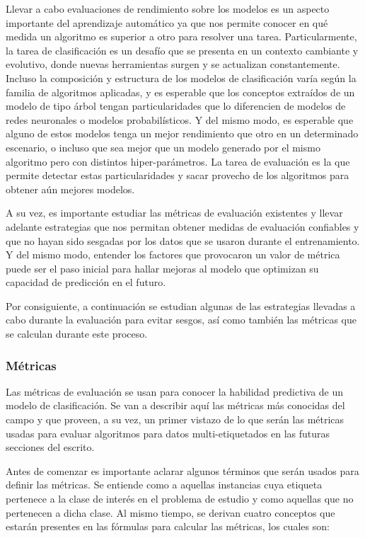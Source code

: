 Llevar a cabo evaluaciones de rendimiento sobre los modelos es un aspecto
importante del aprendizaje automático ya que nos permite conocer en qué medida
un algoritmo es superior a otro para resolver una tarea. Particularmente, la
tarea de clasificación es un desafío que se presenta en un contexto cambiante y
evolutivo, donde nuevas herramientas surgen y se actualizan constantemente.
Incluso la composición y estructura de los modelos de clasificación varía según
la familia de algoritmos aplicadas, y es esperable que los conceptos extraídos
de un modelo de tipo árbol tengan particularidades que lo diferencien de modelos
de redes neuronales o modelos probabilísticos. Y del mismo modo, es esperable
que alguno de estos modelos tenga un mejor rendimiento que otro en un
determinado escenario, o incluso que sea mejor que un modelo generado por el
mismo algoritmo pero con distintos hiper-parámetros. La tarea de evaluación es
la que permite detectar estas particularidades y sacar provecho de los
algoritmos para obtener aún mejores modelos. 

A su vez, es importante estudiar las métricas de evaluación existentes y llevar
adelante estrategias que nos permitan obtener medidas de evaluación confiables y
que no hayan sido sesgadas por los datos que se usaron durante el entrenamiento.
Y del mismo modo, entender los factores que provocaron un valor de métrica puede
ser el paso inicial para hallar mejoras al modelo que optimizan su capacidad de
predicción en el futuro.

Por consiguiente, a continuación se estudian algunas de las estrategias llevadas
a cabo durante la evaluación para evitar sesgos, así como también las métricas
que se calculan durante este proceso.

\subsubsection{Métricas}
\label{evaluacion_metricas}

Las métricas de evaluación se usan para conocer la habilidad predictiva de un
modelo de clasificación. Se van a describir aquí las métricas más conocidas del
campo y que proveen, a su vez, un primer vistazo de lo que serán las métricas
usadas para evaluar algoritmos para datos multi-etiquetados en las futuras
secciones del escrito. 

Antes de comenzar es importante aclarar algunos términos que serán usados para
definir las métricas. Se entiende como  a aquellas
instancias cuya etiqueta pertenece a la clase de interés en el problema de
estudio y  como aquellas que no pertenecen a dicha
clase. Al mismo tiempo, se derivan cuatro conceptos que estarán presentes en las
fórmulas para calcular las métricas, los cuales son: 

